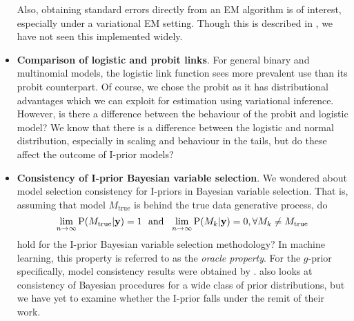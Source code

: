 \documentclass[showframe,11pt,twoside,openright]{report}
\begin{document}
\begin{itemize}
  Also, obtaining standard errors directly from an EM algorithm is of interest, especially under a variational EM setting.
  Though this is described in \citet[ch. 4]{mclachlan2007algorithm}, we have not seen this implemented widely.
  
  \item \textbf{Comparison of logistic and probit links}.
  For general binary and multinomial models, the logistic link function sees more prevalent use than its probit counterpart.
  Of course, we chose the probit as it has distributional advantages which we can exploit for estimation using variational inference.
  However, is there a difference between the behaviour of the probit and logistic model?
  We know that there is a difference between the logistic and normal distribution, especially in scaling and behaviour in the tails, but do these affect the outcome of I-prior models?
  
  \item \textbf{Consistency of I-prior Bayesian variable selection}.
  We wondered about model selection consistency for I-priors in Bayesian variable selection.
  That is, assuming that model $M_\text{true}$ is behind the true data generative process, do
  \[
    \lim_{n\to\infty} \operatorname{P}(M_\text{true}|{\mathbf y}) = 1
    \ \ \text{and} \ \
    \lim_{n\to\infty} \operatorname{P}(M_k|{\mathbf y}) = 0, \forall M_k \neq M_\text{true}
  \]
  hold for the I-prior Bayesian variable selection methodology?
  In machine learning, this property is referred to as the \emph{oracle property}.
  For the $g$-prior specifically, model consistency results were obtained by \citet{fernandez2001benchmark,liang2008mixtures}.
  \citet{casella2009consistency} also looks at consistency of Bayesian procedures for a wide class of prior distributions, but we have yet to examine whether the I-prior falls under the remit of their work.
  
\end{itemize}
\end{document}
